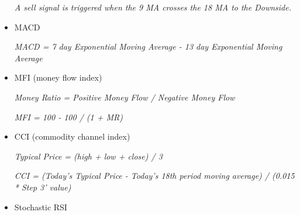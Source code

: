 \documentclass{article}
\begin{document}
\begin{itemize}
\emph{A sell signal is triggered when the 9 MA crosses the 18 MA to the Downside.}
\cite{stock-market-prediction-model-using-TPWS}

\item MACD 

\emph{MACD = 7 day Exponential Moving Average - 13 day Exponential Moving Average}
\cite{stock-market-prediction-model-using-TPWS}

\item MFI (money flow index)

\emph{Money Ratio = Positive Money Flow / Negative Money Flow}

\emph{MFI = 100 - 100 / (1 + MR)}
\cite{stock-market-prediction-model-using-TPWS}

\item CCI (commodity channel index)

\emph{Typical Price = (high + low + close) / 3}

\emph{CCI = (Today's Typical Price - Today's 18th period moving average) / (0.015 * Step 3' value)}
\cite{stock-market-prediction-model-using-TPWS}

\item Stochastic RSI

\end{itemize}



\end{document}
